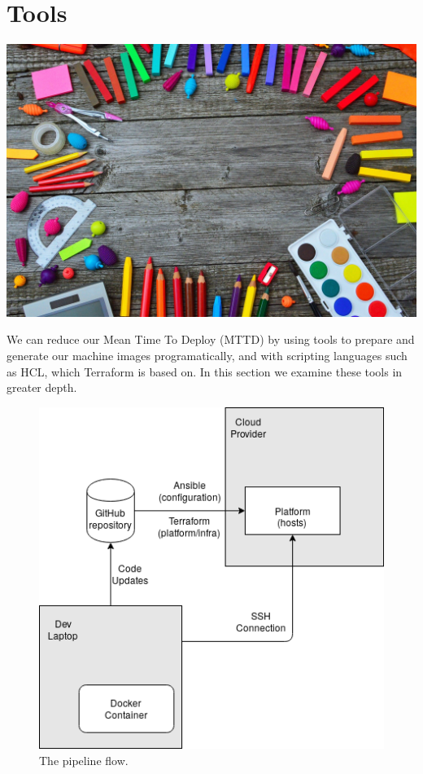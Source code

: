 \chapter{Tools}

\includegraphics{../images/school-tools-3596680_1920.jpg}

We can reduce our Mean Time To Deploy (MTTD)
by using tools to prepare and generate our machine images
programatically, and with scripting languages such as HCL, which
Terraform
is based on. In this section we examine these tools in greater depth.

\begin{figure}
   \centering
   \includegraphics{../images/infra_flow.png}
   \caption{The pipeline flow.}
  \label{infraflow}
\end{figure}


